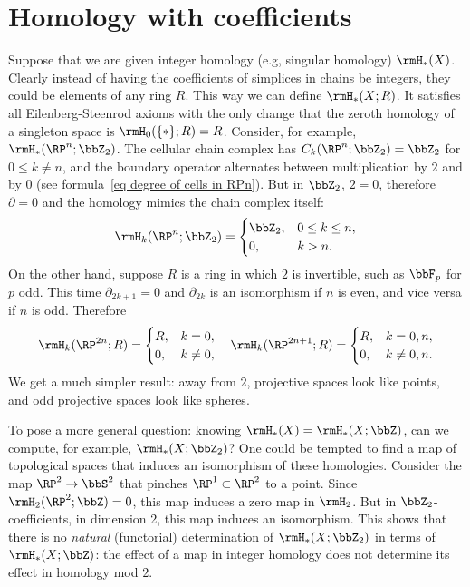 




\section{Homology with coefficients}

Suppose that we are given integer homology (e.g, singular homology) $\rmH_\ast(X)$. Clearly instead of having the coefficients of simplices in chains be integers, they could be elements of any ring $R$. This way we can define $\rmH_\ast(X;R)$. It satisfies all Eilenberg-Steenrod axioms with the only change that the zeroth homology of a singleton space is $\rmH_0(\{\ast\};R)=R$. Consider, for example, $\rmH_\ast(\RP^n;\bbZ_2)$. The cellular chain complex has $C_k(\RP^n;\bbZ_2)=\bbZ_2$ for $0\leq k\neq n$, and the boundary operator alternates between multiplication by $2$ and by $0$ (see formula~\ref{eq degree of cells in RPn}). But in $\bbZ_2$, $2=0$, therefore $\partial=0$ and the homology mimics the chain complex itself:
\[\rmH_k(\RP^n;\bbZ_2)=\begin{cases}
    \bbZ_2,& 0\leq k\leq n,\\
    0, & k>n.
\end{cases}\]
On the other hand, suppose $R$ is a ring in which $2$ is invertible, such as $\bbF_p$ for $p$ odd. This time $\partial_{2k+1}=0$ and $\partial_{2k}$ is an isomorphism if $n$ is even, and vice versa if $n$ is odd. Therefore 
\[\rmH_k(\RP^{2n};R)=\begin{cases}
    R,&k=0,\\
    0,&k\neq 0,
\end{cases}\quad
\rmH_k(\RP^{2n+1};R)=\begin{cases}
    R,&k=0,n,\\
    0,&k\neq 0,n.
\end{cases}
\]
We get a much simpler result: away from $2$, projective spaces look like points, and odd projective spaces look like spheres.

To pose a more general question: knowing $\rmH_\ast(X)=\rmH_\ast(X;\bbZ)$, can we compute, for example, $\rmH_\ast(X;\bbZ_2)$? One could be tempted to find a map of topological spaces that induces an isomorphism of these homologies. Consider the map $\RP^2\to \bbS^2$ that pinches $\RP^1\subset \RP^2$ to a point. Since $\rmH_2(\RP^2;\bbZ)=0$, this map induces a zero map in $\rmH_2$. But in $\bbZ_2$-coefficients, in dimension 2, this map induces an isomorphism. This shows that there is no \emph{natural} (functorial) determination of $\rmH_\ast(X;\bbZ_2)$ in terms of $\rmH_\ast(X;\bbZ)$: the effect of a map in integer homology does not determine its effect in homology mod $2$. 

